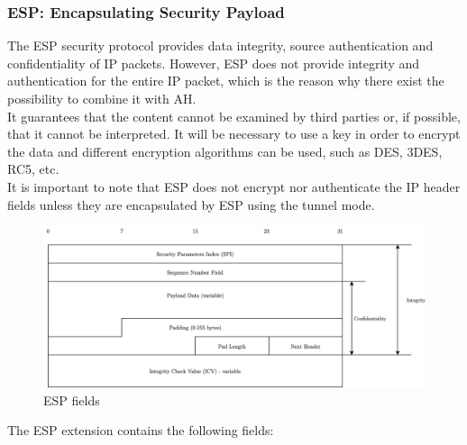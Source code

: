 \documentclass[11pt]{book}
\begin{document}
\subsubsection{ESP: Encapsulating Security Payload}
The ESP security protocol provides data integrity, source authentication and confidentiality of IP packets. However, ESP does not provide integrity and authentication for the entire IP packet, which is the reason why there exist the possibility to combine it with AH.\\
It guarantees that the content cannot be examined by third parties or, if possible, that it cannot be interpreted. It will be necessary to use a key in order to encrypt the data and different encryption algorithms can be used, such as DES, 3DES, RC5, etc. \\
It is important to note that ESP does not encrypt nor authenticate the IP header fields unless they are encapsulated by ESP using the tunnel mode. 
\begin{figure}[H]
	\centering
	\includegraphics [scale=0.165] {esp_header.png}
	\caption{ESP fields}
\end{figure}
The ESP extension contains the following fields:
\end{document}
